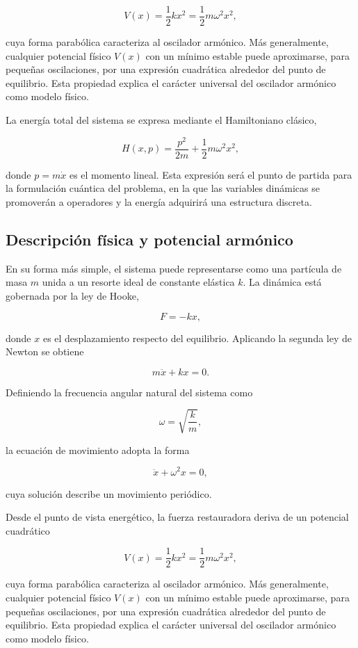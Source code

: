 \documentclass[11pt,a4paper,spanish]{book}
\begin{document}
\[
V(x) = \frac{1}{2} k x^2 = \frac{1}{2} m\omega^2 x^2,
\]

cuya forma parabólica caracteriza al oscilador armónico. Más generalmente, cualquier potencial físico $V(x)$ con un mínimo estable puede aproximarse, para pequeñas oscilaciones, por una expresión cuadrática alrededor del punto de equilibrio. Esta propiedad explica el carácter universal del oscilador armónico como modelo físico.

La energía total del sistema se expresa mediante el Hamiltoniano clásico,

\[
H(x,p) = \frac{p^2}{2m} + \frac{1}{2} m\omega^2 x^2,
\]

donde $p = m\dot{x}$ es el momento lineal. Esta expresión será el punto de partida para la formulación cuántica del problema, en la que las variables dinámicas se promoverán a operadores y la energía adquirirá una estructura discreta.
\subsection{Descripción física y potencial armónico}
En su forma más simple, el sistema puede representarse como una partícula de masa $m$ unida a un resorte ideal de constante elástica $k$. La dinámica está gobernada por la ley de Hooke,

\[
F = -kx,
\]

donde $x$ es el desplazamiento respecto del equilibrio. Aplicando la segunda ley de Newton se obtiene

\[
m\ddot{x} + kx = 0.
\]

Definiendo la frecuencia angular natural del sistema como

\[
\omega = \sqrt{\frac{k}{m}},
\]

la ecuación de movimiento adopta la forma

\[
\ddot{x} + \omega^2 x = 0,
\]

cuya solución describe un movimiento periódico.

Desde el punto de vista energético, la fuerza restauradora deriva de un potencial cuadrático

\[
V(x) = \frac{1}{2} k x^2 = \frac{1}{2} m\omega^2 x^2,
\]

cuya forma parabólica caracteriza al oscilador armónico. Más generalmente, cualquier potencial físico $V(x)$ con un mínimo estable puede aproximarse, para pequeñas oscilaciones, por una expresión cuadrática alrededor del punto de equilibrio. Esta propiedad explica el carácter universal del oscilador armónico como modelo físico.
\end{document}
